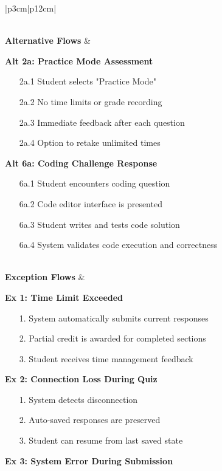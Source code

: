 \documentclass[12pt,a4paper]{article}
\begin{document}
\begin{longtable}{|p{3cm}|p{12cm}|}
\begin{minipage}[t]{\linewidth}
\begin{enumerate}[leftmargin=*,noitemsep,topsep=0pt]
\end{enumerate}
\end{minipage} \\
\hline
\textbf{Alternative Flows} & 
\begin{minipage}[t]{\linewidth}
\textbf{Alt 2a: Practice Mode Assessment}
\begin{enumerate}[leftmargin=*,noitemsep,topsep=0pt]
    \item[2a.1] Student selects "Practice Mode"
    \item[2a.2] No time limits or grade recording
    \item[2a.3] Immediate feedback after each question
    \item[2a.4] Option to retake unlimited times
\end{enumerate}
\textbf{Alt 6a: Coding Challenge Response}
\begin{enumerate}[leftmargin=*,noitemsep,topsep=0pt]
    \item[6a.1] Student encounters coding question
    \item[6a.2] Code editor interface is presented
    \item[6a.3] Student writes and tests code solution
    \item[6a.4] System validates code execution and correctness
\end{enumerate}
\end{minipage} \\
\hline
\textbf{Exception Flows} & 
\begin{minipage}[t]{\linewidth}
\textbf{Ex 1: Time Limit Exceeded}
\begin{enumerate}[leftmargin=*,noitemsep,topsep=0pt]
    \item[1.] System automatically submits current responses
    \item[2.] Partial credit is awarded for completed sections
    \item[3.] Student receives time management feedback
\end{enumerate}
\textbf{Ex 2: Connection Loss During Quiz}
\begin{enumerate}[leftmargin=*,noitemsep,topsep=0pt]
    \item[1.] System detects disconnection
    \item[2.] Auto-saved responses are preserved
    \item[3.] Student can resume from last saved state
\end{enumerate}
\textbf{Ex 3: System Error During Submission}
\begin{enumerate}[leftmargin=*,noitemsep,topsep=0pt]

\end{enumerate}
\end{minipage}
\end{longtable}
\end{document}
